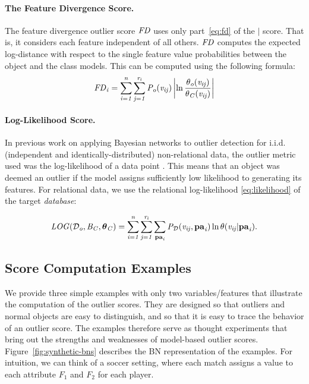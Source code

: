 {\paragraph{The Feature Divergence Score.}
The feature divergence outlier score $\it{FD}$ uses only part~\eqref{eq:fd} of the $\mid$ score. That is, it considers each feature independent of all others.  $\it{FD}$ computes the expected log-distance with respect to  the single feature value probabilities between the object and the class models. This can be computed using the following formula:
\begin{equation}
\it{FD}_{i}	=\sum_{i=1}^{n}\sum_{j=1}^{r_{i}} P_{o}( v_{ij}) \left|\ln \frac{\theta_{o}( v_{ij})}{\theta_{C}( v_{ij})}\right|
\end{equation}


\paragraph{Log-Likelihood Score.} 

In previous work on applying Bayesian networks to outlier detection for i.i.d. (independent and identically-distributed) non-relational data, the outlier metric used was the log-likelihood of a data point \citep{Cansado2008}. This means that an object was deemed an outlier if the model assigns sufficiently low likelihood to generating its features. For relational data, we use the relational log-likelihood \eqref{eq:likelihood} of the target {\em database}:

\begin{equation} \label{eq:loglikelihood-score}
\it{LOG}(\mathcal{D}_{o},B_{C},\boldsymbol{\theta}_{C}) =   \sum_{i=1}^{n}\sum_{j=1}^{r_{i}} \sum_{\mathbf{pa}_{i}}P_{\mathcal{D}}(v_{ij},\mathbf{pa}_{i})\ln \theta(v_{ij}|\mathbf{pa}_{i}).
\end{equation}




\subsection{Score Computation Examples} \label{sec:divergence-examples} 
			
			
			We provide three simple examples with only two variables/features that illustrate the computation of the outlier scores. They are designed so that outliers and normal objects are easy to distinguish, and so that it is easy to trace the behavior of an outlier score.
			The examples therefore serve as thought experiments that bring out the strengths and weaknesses of model-based outlier scores. 
			Figure~\ref{fig:synthetic-bns} describes the BN representation of the examples. For intuition, we can think of a soccer setting, where each match assigns a value to each attribute $F_{1}$ and $F_{2}$ for each player. 
			
}
